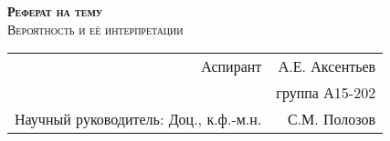 
\begin{titlepage}
	\begin{center}
		
		
		\textsc{\textbf{Реферат на тему}}\\[2cm]
		
		\textsc{Вероятность и её интерпретации \\[2.4cm] }
		
		
	\end{center}
	
	
	\begin{flushright}
		\begin{tabular}{rr}
			Аспирант \underline{\hspace*{3cm}} & А.Е. Аксентьев \\
			&	группа А15-202 \\					
			Научный руководитель:          Доц., к.ф.-м.н. \underline{\hspace*{3cm}} & С.М. Полозов 	\\
		\end{tabular}
		
	\end{flushright}
	
	\vfill
	
	
	\begin{center}
		\the\year{}
	\end{center}
	
	
	
\end{titlepage}